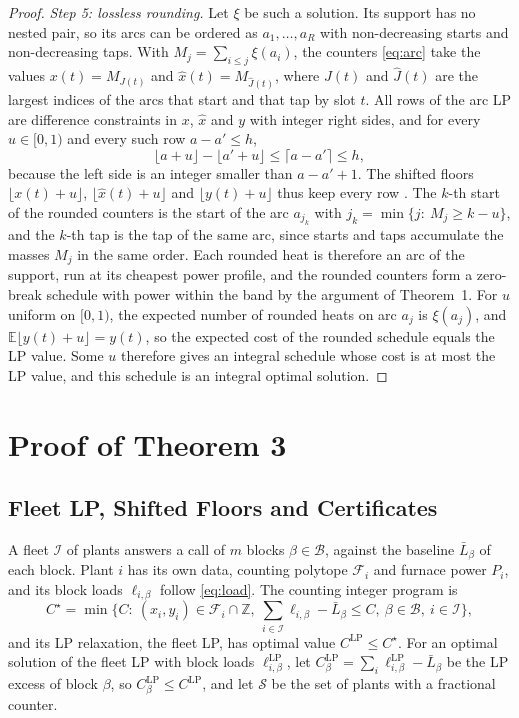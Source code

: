 \documentclass[11pt]{article}
\newcommand{\calF}{\mathcal{F}}
\newcommand{\calB}{\mathcal{B}}
\newcommand{\calS}{\mathcal{S}}
\newcommand{\calI}{\mathcal{I}}
\newcommand{\Z}{\mathbb{Z}}
\newcommand{\Cs}{C^{\star}}
\newcommand{\CLP}{C^{\mathrm{LP}}}
\begin{document}
\begin{proof}
\emph{Step 5: lossless rounding.} Let $\xi$ be such a solution. Its support has no nested pair, so its arcs can be
ordered as $a_1,\dots,a_R$ with non-decreasing starts and non-decreasing taps. With $M_j=\sum_{i\le j}\xi(a_i)$, the
counters \eqref{eq:arc} take the values $x(t)=M_{J(t)}$ and $\hat x(t)=M_{\hat J(t)}$, where $J(t)$ and $\hat J(t)$ are
the largest indices of the arcs that start and that tap by slot $t$. All rows of the arc LP are difference constraints
in $x$, $\hat x$ and $y$ with integer right sides, and for every $u\in[0,1)$ and every such row $a-a'\le h$,
\begin{equation}\label{eq:floor}
\lfloor a+u\rfloor-\lfloor a'+u\rfloor\le\lceil a-a'\rceil\le h,
\end{equation}
because the left side is an integer smaller than $a-a'+1$. The shifted floors $\lfloor x(t)+u\rfloor$, $\lfloor\hat
x(t)+u\rfloor$ and $\lfloor y(t)+u\rfloor$ thus keep every row \cite{bansal2008sicomp}. The $k$-th start of the
rounded counters is the start of the arc $a_{j_k}$ with $j_k=\min\{j:\ M_j\ge k-u\}$, and the $k$-th tap is the tap of
the same arc, since starts and taps accumulate the masses $M_j$ in the same order. Each rounded heat is therefore an
arc of the support, run at its cheapest power profile, and the rounded counters form a zero-break schedule with power
within the band by the argument of Theorem~1. For $u$ uniform on $[0,1)$, the expected number of rounded heats on arc
$a_j$ is $\xi(a_j)$, and $\mathbb E\lfloor y(t)+u\rfloor=y(t)$, so the expected cost of the rounded schedule equals the
LP value. Some $u$ therefore gives an integral schedule whose cost is at most the LP value, and this schedule is an
integral optimal solution.
\end{proof}

\section{Proof of Theorem 3}\label{sec:thm3}

\subsection{Fleet LP, Shifted Floors and Certificates}

A fleet $\calI$ of plants answers a call of $m$ blocks $\beta\in\calB$, against the baseline $\bar L_\beta$ of each
block. Plant $i$ has its own data, counting polytope $\calF_i$ and furnace power $P_i$, and its block loads
$\ell_{i,\beta}$ follow \eqref{eq:load}. The counting integer program is
\begin{equation}\label{eq:ip}
\Cs=\min\Big\{C:\ (x_i,y_i)\in\calF_i\cap\Z,\ \sum_{i\in\calI}\ell_{i,\beta}-\bar L_\beta\le C,\ \beta\in\calB,\
i\in\calI\Big\},
\end{equation}
and its LP relaxation, the fleet LP, has optimal value $\CLP\le\Cs$. For an optimal solution of the fleet LP with block
loads $\ell^{\mathrm{LP}}_{i,\beta}$, let $\CLP_\beta=\sum_i\ell^{\mathrm{LP}}_{i,\beta}-\bar L_\beta$ be the LP excess
of block $\beta$, so $\CLP_\beta\le\CLP$, and let $\calS$ be the set of plants with a fractional counter.
\end{document}
